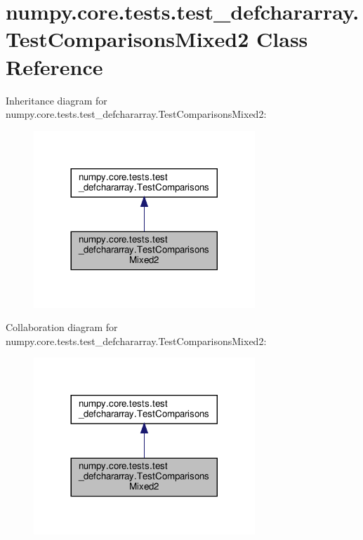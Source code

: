 \hypertarget{classnumpy_1_1core_1_1tests_1_1test__defchararray_1_1TestComparisonsMixed2}{}\section{numpy.\+core.\+tests.\+test\+\_\+defchararray.\+Test\+Comparisons\+Mixed2 Class Reference}
\label{classnumpy_1_1core_1_1tests_1_1test__defchararray_1_1TestComparisonsMixed2}


Inheritance diagram for numpy.\+core.\+tests.\+test\+\_\+defchararray.\+Test\+Comparisons\+Mixed2\+:
\nopagebreak
\begin{figure}[H]
\begin{center}
\leavevmode
\includegraphics[width=236pt]{classnumpy_1_1core_1_1tests_1_1test__defchararray_1_1TestComparisonsMixed2__inherit__graph}
\end{center}
\end{figure}


Collaboration diagram for numpy.\+core.\+tests.\+test\+\_\+defchararray.\+Test\+Comparisons\+Mixed2\+:
\nopagebreak
\begin{figure}[H]
\begin{center}
\leavevmode
\includegraphics[width=236pt]{classnumpy_1_1core_1_1tests_1_1test__defchararray_1_1TestComparisonsMixed2__coll__graph}
\end{center}
\end{figure}
